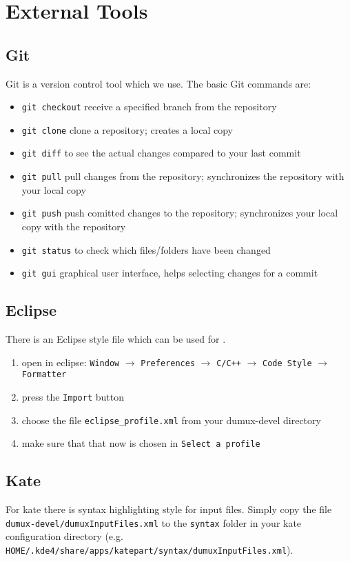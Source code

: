 \section{External Tools}
\label{sc_externaltools}

\subsection{Git}
Git is a version control tool which we use.
The basic Git commands are:
\begin{itemize}
  \item \texttt{git checkout} receive a specified branch from the repository
  \item \texttt{git clone} clone a repository; creates a local copy
  \item \texttt{git diff} to see the actual changes compared to your last commit
  \item \texttt{git pull} pull changes from the repository; synchronizes the
  repository with your local copy
  \item \texttt{git push} push comitted changes to the repository;  synchronizes
  your local copy with the repository
  \item \texttt{git status} to check which files/folders have been changed
  \item \texttt{git gui} graphical user interface, helps selecting changes for
  a commit
\end{itemize}

\subsection{Eclipse}
There is an Eclipse style file which can be used for \Dumux.
\begin{enumerate}
  \item open in eclipse: \texttt{Window} $\rightarrow$ \texttt{Preferences} $\rightarrow$
        \texttt{C/C++}  $\rightarrow$ \texttt{Code Style} $\rightarrow$ \texttt{Formatter}
  \item press the \texttt{Import} button
  \item choose the file \texttt{eclipse\_profile.xml} from your dumux-devel directory
  \item make sure that that now \Dumux is chosen in \texttt{Select a profile}
\end{enumerate}

\subsection{Kate}
For kate there is syntax highlighting style for \Dumux input files. Simply
copy the file \texttt{dumux-devel/dumux\-InputFiles.xml} to the \texttt{syntax} folder in
your kate configuration directory (e.g.
\texttt{HOME/.kde4/share/apps\-/katepart/syntax/dumuxInputFiles.xml}).

